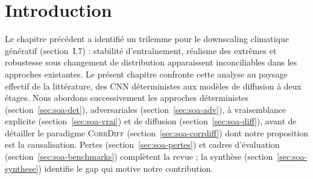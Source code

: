 \documentclass[14pt,a4paper,openany]{extreport}
\theoremstyle{definition}
\newcommand{\CorrDiff}{\textsc{CorrDiff}}
\begin{document}
\vspace{1.5em}

\section{Introduction}
\label{sec:soa-intro}

Le chapitre précédent a identifié un trilemme pour le downscaling climatique génératif (section~I.7) : stabilité d'entraînement, réalisme des extrêmes et robustesse sous changement de distribution apparaissent inconciliables dans les approches existantes. Le présent chapitre confronte cette analyse au paysage effectif de la littérature, des CNN déterministes aux modèles de diffusion à deux étages. Nous abordons successivement les approches déterministes (section~\ref{sec:soa-det}), adversariales (section~\ref{sec:soa-adv}), à vraisemblance explicite (section~\ref{sec:soa-vrai}) et de diffusion (section~\ref{sec:soa-diff}), avant de détailler le paradigme \CorrDiff{} (section~\ref{sec:soa-corrdiff}) dont notre proposition est la causalisation. Pertes (section~\ref{sec:soa-pertes}) et cadres d'évaluation (section~\ref{sec:soa-benchmarks}) complètent la revue ; la synthèse (section~\ref{sec:soa-synthese}) identifie le gap qui motive notre contribution.
\end{document}
